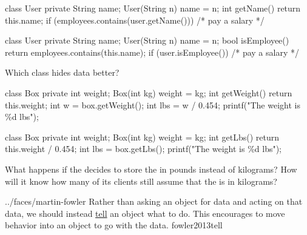 \documentclass{article}
\begin{document}
\begin{pptWide}{2}
{\small\begin{ffcode}
class User {
  private String name;
  User(String n) { name = n; }
  int getName() {
    return this.name;
  }
}
if (employees.contains(user.getName())) {
  /* pay a salary */
}
\end{ffcode}
}
\par\columnbreak\par
{\small\begin{ffcode}
class User {
  private String name;
  User(String n) { name = n; }
  bool isEmployee() {
    return employees.contains(this.name);
  }
}
if (user.isEmployee()) {
  /* pay a salary */
}
\end{ffcode}
}
\end{pptWide}
\par
Which class hides data better?
\plush{}

\begin{pptWide}{2}
{\small\begin{ffcode}
class Box {
  private int weight;
  Box(int kg) { weight = kg; }
  int getWeight() {
    return this.weight;
  }
}
int w = box.getWeight();
int lbs = w / 0.454;
printf("The weight is \%d lbs\n");
\end{ffcode}
}
\par\columnbreak\par
{\small\begin{ffcode}
class Box {
  private int weight;
  Box(int kg) { weight = kg; }
  int getLbs() {
    return this.weight / 0.454;
  }
}
int lbs = box.getLbs();
printf("The weight is \%d lbs\n");
\end{ffcode}
}
\end{pptWide}
\par
What happens if the  decides to store the  in pounds instead of kilograms? How will it know how many of its clients still assume that the  is in kilograms?~\citep{bugayenko2014blog0916}
\plush{}


\qte
  {../faces/martin-fowler}
  {Rather than asking an object for data and acting on that data, we should instead \ul{tell} an object what to do. This encourages to move behavior into an object to go with the data.}
  {fowler2013tell}
\end{document}
